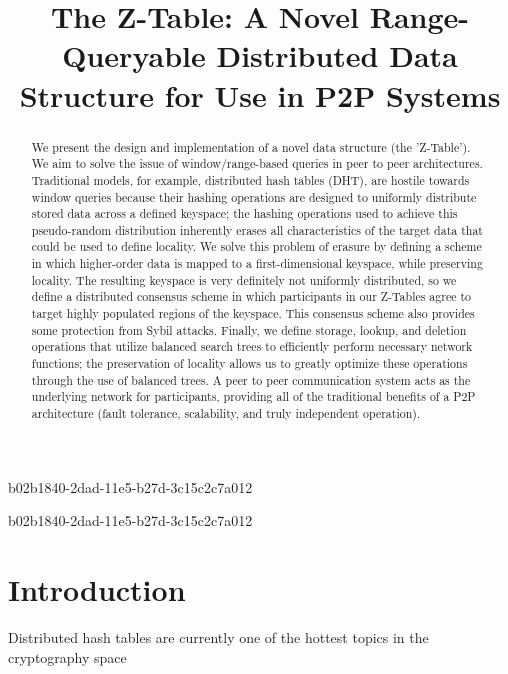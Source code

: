 \documentclass[12pt]{article}
\title{The Z-Table: A Novel Range-Queryable Distributed Data Structure for Use in P2P Systems}
\begin{document}
\maketitle

b02b1840-2dad-11e5-b27d-3c15c2c7a012\begin{abstract}
We present the design and implementation of a novel data structure (the 'Z-Table'). We aim to solve the issue of window/range-based queries in peer to peer architectures. Traditional models, for example,  distributed hash tables (DHT), are hostile towards window queries because their hashing operations are designed to uniformly distribute stored data across a defined keyspace; the hashing operations used to achieve this pseudo-random distribution inherently erases all characteristics of the target data that could be used to define locality. We solve this problem of erasure by defining a scheme in which higher-order data is mapped to a first-dimensional keyspace, while preserving locality. The resulting keyspace is very definitely not uniformly distributed, so we define a distributed consensus scheme in which participants in our Z-Tables agree to target highly populated regions of the keyspace. This consensus scheme also provides some protection from Sybil attacks. Finally, we define storage, lookup, and deletion operations that utilize balanced search trees to efficiently perform necessary network functions; the preservation of locality allows us to greatly optimize these operations through the use of balanced trees. A peer to peer communication system acts as the underlying network for participants, providing all of the traditional benefits of a P2P architecture (fault tolerance, scalability, and truly independent operation).
\end{abstract}


b02b1840-2dad-11e5-b27d-3c15c2c7a012\newpage
\section{Introduction}
Distributed hash tables are currently one of the hottest topics in the cryptography space~\cite{Stoica:2001dj,Rowstron:2001ea,Ratnasamy:2001wn}

\printbibliography
\end{document}
